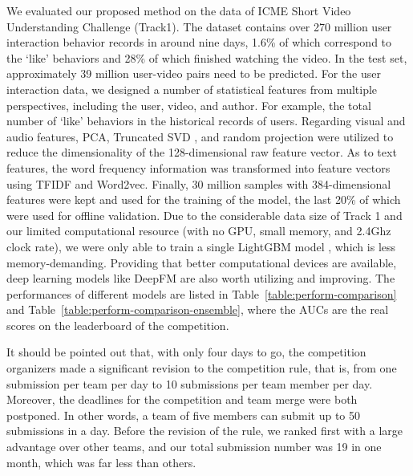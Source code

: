 \documentclass{article}
\begin{document}
We evaluated our proposed method on the data of ICME Short Video Understanding Challenge (Track1). The dataset contains over 270 million user interaction behavior records in around nine days, 1.6\% of which correspond to the ‘like’ behaviors and 28\% of which finished watching the video. In the test set, approximately 39 million user-video pairs need to be predicted. For the user interaction data, we designed a number of statistical features from multiple perspectives, including the user, video, and author. For example, the total number of ‘like’ behaviors in the historical records of users. Regarding visual and audio features, PCA, Truncated SVD \cite{manning_matrix_2008}, and random projection \cite{dasgupta_experiments_2000} were utilized to reduce the dimensionality of the 128-dimensional raw feature vector. As to text features, the word frequency information was transformed into feature vectors using TFIDF and Word2vec. Finally, 30 million samples with 384-dimensional features were kept and used for the training of the model, the last 20\% of which were used for offline validation. Due to the considerable data size of Track 1 and our limited computational resource (with no GPU, small memory, and 2.4Ghz clock rate), we were only able to train a single LightGBM model \cite{ke_lightgbm:_2017}, which is less memory-demanding. Providing that better computational devices are available, deep learning models like DeepFM \cite{guo_deepfm:_2017} are also worth utilizing and improving. The performances of different models are listed in Table~\ref{table:perform-comparison} and Table~\ref{table:perform-comparison-ensemble}, where the AUCs are the real scores on the leaderboard of the competition.

It should be pointed out that, with only four days to go, the competition organizers made a significant revision to the competition rule, that is, from one submission per team per day to 10 submissions per team member per day. Moreover, the deadlines for the competition and team merge were both postponed. In other words, a team of five members can submit up to 50 submissions in a day. Before the revision of the rule, we ranked first with a large advantage over other teams, and our total submission number was 19 in one month, which was far less than others.
\end{document}

